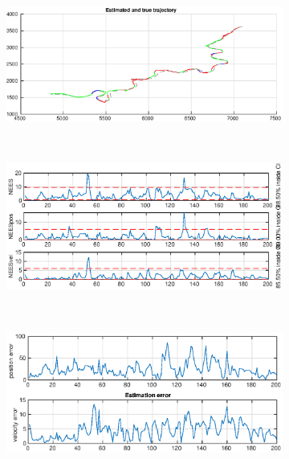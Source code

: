 \begin{figure}[ht]
\begin{subfigure}[b]{0.4\textwidth}
        \caption{}
        \label{fig:ga_1_2_estimated_trajectory}
    \end{subfigure}%
        ~
    \begin{subfigure}[b]{0.4\textwidth}
        \includegraphics[width=\textwidth]{figures/ga_1/joyride_estimated_trajectory}
        \caption{}
        \label{fig:ga_1_joyride_estimated_trajectory}
    \end{subfigure}
        \\
    \begin{subfigure}[b]{0.4\textwidth}
        \includegraphics[width=\textwidth]{figures/ga_1/2_error}
        \caption{}
        \label{fig:ga_1_2_error}
    \end{subfigure}%
        ~
    \begin{subfigure}[b]{0.4\textwidth}
        \includegraphics[width=\textwidth]{figures/ga_1/joyride_error}
        \caption{}
        \label{fig:ga_1_joyride_error}
    \end{subfigure}
    \label{fig:ga_1} 
\end{figure}

